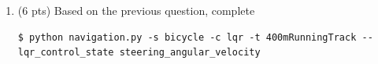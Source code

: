 \documentclass[11pt]{article}
\begin{document}
\begin{enumerate}
\begin{equation*}
\begin{split}
                                   & = \begin{bmatrix} 
                                    \textcolor{blue}{1} & \textcolor{blue}{v \Delta t} & \textcolor{blue}{0} \\ 
                                    \textcolor{blue}{0} & \textcolor{blue}{1} & \textcolor{blue}{\frac{v \Delta t}{L}} \\ 
                                    \textcolor{blue}{0} & \textcolor{blue}{0} & \textcolor{blue}{1} \end{bmatrix}
                  \begin{bmatrix} e_k \\ \theta_{e,k} \\ \delta_k \end{bmatrix} +
                  \begin{bmatrix} 
                    \textcolor{blue}{0} \\ 
                    \textcolor{blue}{0} \\ 
                    \textcolor{blue}{\Delta t} \end{bmatrix}
                  \begin{bmatrix} \dot{\delta}_k \end{bmatrix}
              \end{split}
          \end{equation*}
    \item \textbf{\faPython} (6 pts) Based on the previous question, complete \textcolor{teal}{\texttt{\allowbreak{}}}
          \begin{lstlisting}
$ python navigation.py -s bicycle -c lqr -t 400mRunningTrack --lqr_control_state steering_angular_velocity
          \end{lstlisting}
\end{enumerate}
\end{document}

